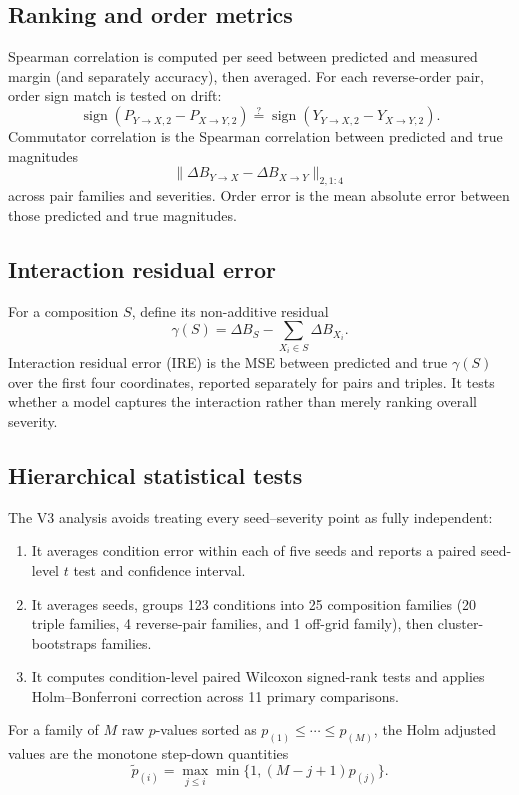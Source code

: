 \documentclass[11pt,a4paper]{article}
\newcommand{\dB}{\Delta B}
\newcommand{\sign}{\operatorname{sign}}
\begin{document}
\subsection{Ranking and order metrics}

Spearman correlation is computed per seed between predicted and measured
margin (and separately accuracy), then averaged.  For each reverse-order pair,
order sign match is tested on drift:
\begin{equation}
\sign(P_{Y\to X,2}-P_{X\to Y,2})
\stackrel{?}{=}
\sign(Y_{Y\to X,2}-Y_{X\to Y,2}).
\end{equation}
Commutator correlation is the Spearman correlation between predicted and true
magnitudes
\[
\|\dB_{Y\to X}-\dB_{X\to Y}\|_{2,1:4}
\]
across pair families and severities.  Order error is the mean absolute error
between those predicted and true magnitudes.

\subsection{Interaction residual error}

For a composition $S$, define its non-additive residual
\begin{equation}
\gamma(S)=\dB_S-\sum_{X_i\in S}\dB_{X_i}.
\end{equation}
Interaction residual error (IRE) is the MSE between predicted and true
$\gamma(S)$ over the first four coordinates, reported separately for pairs and
triples.  It tests whether a model captures the interaction rather than merely
ranking overall severity.

\subsection{Hierarchical statistical tests}

The V3 analysis avoids treating every seed--severity point as fully
independent:
\begin{enumerate}
  \item It averages condition error within each of five seeds and reports a
  paired seed-level $t$ test and confidence interval.
  \item It averages seeds, groups 123 conditions into 25 composition families
  (20 triple families, 4 reverse-pair families, and 1 off-grid family), then
  cluster-bootstraps families.
  \item It computes condition-level paired Wilcoxon signed-rank tests and
  applies Holm--Bonferroni correction across 11 primary comparisons.
\end{enumerate}
For a family of $M$ raw $p$-values sorted as
$p_{(1)}\le\cdots\le p_{(M)}$, the Holm adjusted values are the monotone
step-down quantities
\begin{equation}
\widetilde p_{(i)}=
\max_{j\le i}\min\{1,(M-j+1)p_{(j)}\}.
\end{equation}
\end{document}
